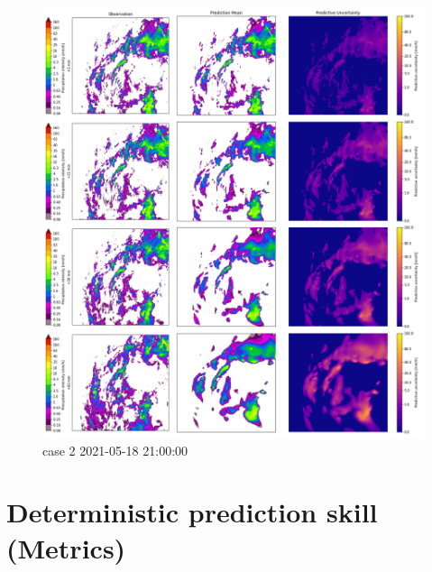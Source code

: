 \begin{figure}
	\label{fig:case2_bcnn_lt5}
	\centering
	\hspace*{-1.5cm}
	\includegraphics[width=1.2\textwidth]{images/cases/2021-05-18 21:00:00_bcnn_p2_lt5_lt5_15_30_60}
	\caption{case 2 2021-05-18 21:00:00}
\end{figure}


\section{Deterministic prediction skill (Metrics)}


